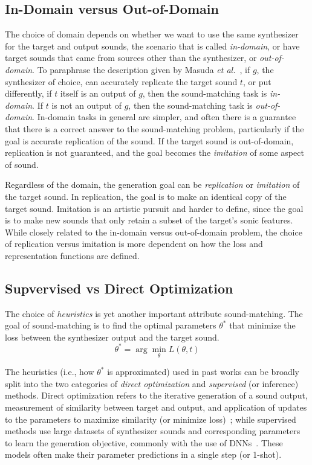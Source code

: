 \subsection{In-Domain versus Out-of-Domain}
\label{sec:in-domain}
The choice of domain depends on whether we want to use the same synthesizer for the target and output sounds, the scenario that is called \textit{in-domain}, or have target sounds that came from sources other than the synthesizer, or \textit{out-of-domain}. To paraphrase the description given by Masuda \textit{et al.}~\cite{masuda2021soundmatch}, if $g$, the synthesizer of choice, can accurately replicate the target sound $t$, or put differently, if $t$ itself is an output of $g$, then the sound-matching task is \textit{in-domain}. If $t$ is not an output of $g$, then the sound-matching task is \textit{out-of-domain}. In-domain tasks in general are simpler, and often there is a guarantee that there is a correct answer to the sound-matching problem, particularly if the goal is accurate replication of the sound. If the target sound is out-of-domain, replication is not guaranteed, and the goal becomes the \textit{imitation} of some aspect of sound. 

Regardless of the domain, the generation goal can be \textit{replication} or \textit{imitation} of the target sound. In replication, the goal is to make an identical copy of the target sound. Imitation is an artistic pursuit and harder to define, since the goal is to make new sounds that only retain a subset of the target's sonic features. While closely related to the in-domain versus out-of-domain problem, the choice of replication versus imitation is more dependent on how the loss and representation functions are defined. 

\subsection{Supvervised vs Direct Optimization}
\label{sec:optimization}

The choice of \textit{heuristics} is yet another important attribute sound-matching. The goal of sound-matching is to find the optimal parameters $\theta^*$ that minimize the loss between the synthesizer output and the target sound. 
\[
\theta^* = \arg\min_{\theta} L(\theta,t)
\]

The heuristics (i.e., how $\theta^*$ is approximated) used in past works can be broadly split into the two categories of \textit{direct optimization} and \textit{supervised}  (or inference) methods. Direct optimization refers to the iterative generation of a sound output, measurement of similarity between target and output, and application of updates to the parameters to maximize similarity (or minimize loss)~\cite{horner1993machine,mitchell2007evolutionary,yee2018automatic,vahidi2023mesostructures}; while supervised methods use large datasets of synthesizer sounds and corresponding parameters to learn the generation objective, commonly with the use of DNNs~\cite{engel2020ddsp,salimi2020make,yee2018automatic,esling2019flow}. These models often make their parameter predictions in a single step (or 1-shot). 

